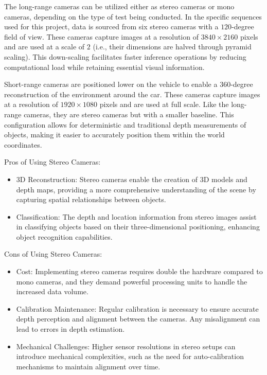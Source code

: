 The long-range cameras can be utilized either as stereo cameras or mono cameras, depending on the type of test being conducted. In the specific sequences used for this project, data is sourced from six stereo cameras with a $120$-degree field of view. These cameras capture images at a resolution of $3840 \times 2160$ pixels and are used at a scale of $2$ (i.e., their dimensions are halved through pyramid scaling). This down-scaling facilitates faster inference operations by reducing computational load while retaining essential visual information.

Short-range cameras are positioned lower on the vehicle to enable a $360$-degree reconstruction of the environment around the car. These cameras capture images at a resolution of $1920 \times 1080$ pixels and are used at full scale. Like the long-range cameras, they are stereo cameras but with a smaller baseline. This configuration allows for deterministic and traditional depth measurements of objects, making it easier to accurately position them within the world coordinates.

Pros of Using Stereo Cameras:
\begin{itemize}
    \item 3D Reconstruction: Stereo cameras enable the creation of 3D models and depth maps, providing a more comprehensive understanding of the scene by capturing spatial relationships between objects.
    \item Classification: The depth and location information from stereo images assist in classifying objects based on their three-dimensional positioning, enhancing object recognition capabilities.
\end{itemize}

Cons of Using Stereo Cameras:
\begin{itemize}
    \item Cost: Implementing stereo cameras requires double the hardware compared to mono cameras, and they demand powerful processing units to handle the increased data volume.
    \item Calibration Maintenance: Regular calibration is necessary to ensure accurate depth perception and alignment between the cameras. Any misalignment can lead to errors in depth estimation.
    \item Mechanical Challenges: Higher sensor resolutions in stereo setups can introduce mechanical complexities, such as the need for auto-calibration mechanisms to maintain alignment over time.
\end{itemize}

